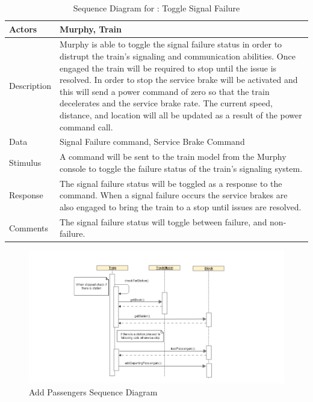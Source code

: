 \documentclass[]{article}
\begin{document}
\begin{table}[H]
	\centering
	\caption{Sequence Diagram for : Toggle Signal Failure}
	\begin{tabular}{|l|l|}
		\hline
		Actors & \parbox[t]{10cm}{Murphy, Train} \\ \hline
		Description & \parbox[t]{10cm}{Murphy is able to toggle the signal failure status in order to distrupt the train's signaling and communication abilities. Once engaged the train will be required to stop until the issue is resolved. In order to stop the service brake will be activated and this will send a power command of zero so that the train decelerates and the service brake rate. The current speed, distance, and location will all be updated as a result of the power command call.} \\ \hline
		Data &  \parbox[t]{10cm}{Signal Failure command, Service Brake Command} \\ \hline
		Stimulus &  \parbox[t]{10cm}{A command will be sent to the train model from the Murphy console to toggle the failure status of the train's signaling system.} \\ \hline
		Response & \parbox[t]{10cm}{The signal failure status will be toggled as a response to the command. When a signal failure occurs the service brakes are also engaged to bring the train to a stop until issues are resolved.}\\ \hline
		Comments & \parbox[t]{10cm}{The signal failure status will toggle between failure, and non-failure.}  \\ \hline
	\end{tabular}
\end{table}

\begin{figure}[H]
	\centering
	\includegraphics[scale=.5]{train_model_sqd_add_passengers.png}
	\caption{Add Passengers Sequence Diagram}
\end{figure}
\end{document}

